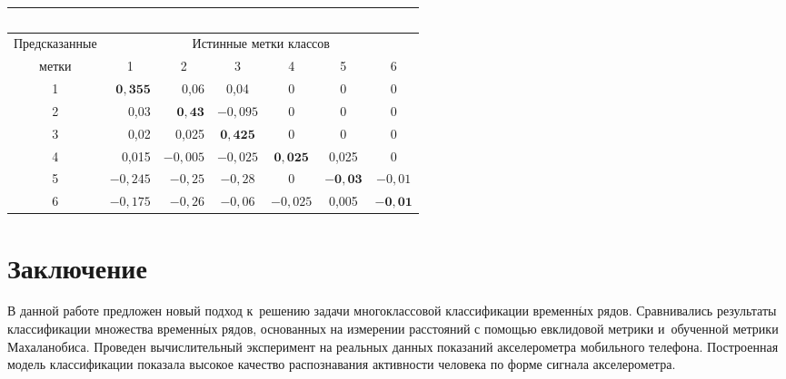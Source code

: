 \begin{multicols}{2}
\addtocounter{table}{1}


\begin{table*}\small
\begin{center}
\parbox{348pt}{
\label{improvement}

}

\begin{tabular}{|c|r|r|c|c|c|c|}
\multicolumn{7}{c}{\ }\\[-4pt]
\hline
\multicolumn{1}{|c|}{Предсказанные}& \multicolumn{6}{c|}{Истинные метки классов}       \\ 
\cline{2-7}
\multicolumn{1}{|c|}{метки}    & \multicolumn{1}{c|}{1} & \multicolumn{1}{c|}{2} & 3 & 4 & 5 & 6\\ 
    \hline
1 & $\mathbf{0{,}355}$& 0,06\hphantom{9,} & \hphantom{$-$}0,04\hphantom{9} & 0 & 0\hphantom{,999}& 0\hphantom{9}     \\ 
2 & 0,03\hphantom{9,}   & $\mathbf{0{,}43}$\hphantom{9}   & $-0{,}095$ & 0& 0\hphantom{,999} & 0\hphantom{9} \\ 
3 & 0,02\hphantom{9,}   & 0,025\hphantom{,}  & \hphantom{9,}$\mathbf{0{,}425}$  & 0  & 0\hphantom{,999} & 0\hphantom{9}\\ 
4 & 0,015\hphantom{,}  & $-0{,}005$\hphantom{,} & $-0{,}025$ & \hphantom{9.9.9}$\mathbf{0{,}025}$ & 0,025 & 0\hphantom{9}\\ 
5 & $-0{,}245$\hphantom{,} & $-0{,}25$\hphantom{9,}  & $-0{,}28$\hphantom{9}  & 0 & $\mathbf{-0{,}03}$\hphantom{99} & $-0{,}01$ \\ 
6 & $-0{,}175$\hphantom{,} & $-0{,}26$\hphantom{9,}  & $-0{,}06$\hphantom{9}  & \hphantom{$-$,}$-0{,}025$ & 0,005 & $\mathbf{-0{,}01}$ \\ 
\hline
\end{tabular}
\end{center}
\end{table*}

\vspace*{-6pt}

\section{Заключение}

В данной работе предложен новый подход к~решению задачи многоклассовой 
классификации временн$\acute{\mbox{ы}}$х рядов.
Сравнивались результаты классификации множества временн$\acute{\mbox{ы}}$х рядов, 
основанных на измерении расстояний
с помощью евклидовой метрики и~обученной метрики Махаланобиса.
Проведен вычислительный эксперимент на реальных данных показаний 
акселерометра мобильного телефона.
Построенная модель классификации показала высокое качество распознавания 
активности человека по форме сигнала акселерометра.



\end{multicols}

